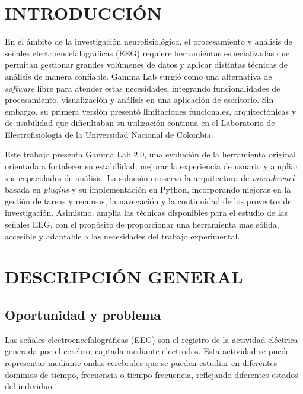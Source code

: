 \documentclass[12pt,letterpaper,oneside]{article}
\newcommand{\capitulo}[1]{\clearpage\section{#1}}
\begin{document}
\clearpage
{}

\capitulo{INTRODUCCIÓN}

En el ámbito de la investigación neurofisiológica, el procesamiento y análisis de señales electroencefalográficas (EEG) requiere herramientas especializadas que permitan gestionar grandes volúmenes de datos y aplicar distintas técnicas de análisis de manera confiable. Gamma Lab surgió como una alternativa de \textit{software} libre para atender estas necesidades, integrando funcionalidades de procesamiento, visualización y análisis en una aplicación de escritorio. Sin embargo, su primera versión presentó limitaciones funcionales, arquitectónicas y de usabilidad que dificultaban su utilización continua en el Laboratorio de Electrofisiología de la Universidad Nacional de Colombia.

Este trabajo presenta Gamma Lab 2.0, una evolución de la herramienta original orientada a fortalecer su estabilidad, mejorar la experiencia de usuario y ampliar sus capacidades de análisis. La solución conserva la arquitectura de \textit{microkernel} basada en \textit{plugins} y su implementación en Python, incorporando mejoras en la gestión de tareas y recursos, la navegación y la continuidad de los proyectos de investigación. Asimismo, amplía las técnicas disponibles para el estudio de las señales EEG, con el propósito de proporcionar una herramienta más sólida, accesible y adaptable a las necesidades del trabajo experimental.

\capitulo{DESCRIPCIÓN GENERAL}

\subsection{Oportunidad y problema}

Las señales electroencefalográficas (EEG) son el registro de la actividad eléctrica generada por el cerebro, captada mediante electrodos. Esta actividad se puede representar mediante ondas cerebrales que se pueden estudiar en diferentes dominios de tiempo, frecuencia o tiempo-frecuencia, reflejando diferentes estados del individuo \cite{singh2023}.
\end{document}
